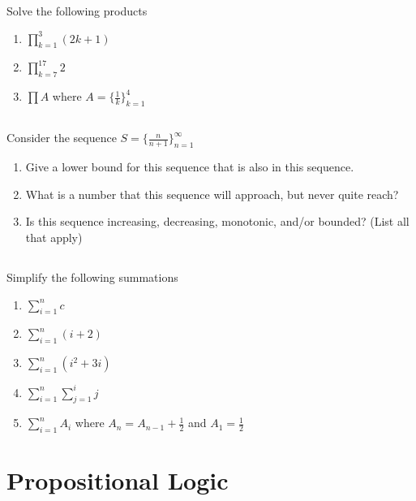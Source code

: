 \documentclass[twocolumn]{article}
\begin{document}
    Solve the following products

    \begin{enumerate}
        \item $ \prod_{k=1}^{3} (2k + 1) $
        \item $ \prod_{k=7}^{17} 2 $
        \item $ \prod A $ where $ A = \{ \frac{1}{k} \}^{4}_{k=1} $
    \end{enumerate}

\subsection{}

    Consider the sequence $S = \{ \frac{n}{n+1} \}^\infty_{n=1} $

    \begin{enumerate}
        \item Give a lower bound for this sequence that is also in this sequence.
        \item What is a number that this sequence will approach, but never quite reach?
        \item Is this sequence increasing, decreasing, monotonic, and/or bounded? (List all that apply)
    \end{enumerate}

\subsection{}

Simplify the following summations

\begin{enumerate}
    \item $ \sum_{i=1}^{n} c $
    \item $ \sum_{i=1}^{n} ( i + 2 ) $
    \item $ \sum_{i=1}^{n} ( i^2 + 3i ) $
    \item $ \sum_{i=1}^{n} \sum_{j=1}^{i} j $
    \item $ \sum_{i=1}^{n} A_i $ where $ A_n = A_{n-1} + \frac{1}{2} $ and $ A_1 = \frac{1}{2} $
\end{enumerate}


\clearpage
\section{Propositional Logic}

\subsection{}
\end{document}
